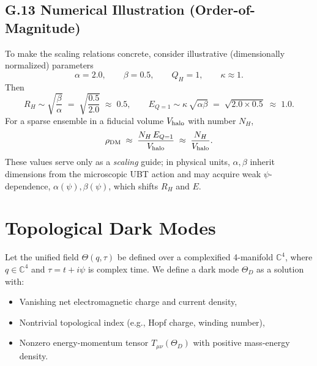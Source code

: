 \documentclass[12pt,a4paper]{article}
\numberwithin{equation}{section}
\theoremstyle{definition}
\theoremstyle{remark}
\begin{document}
\subsection*{G.13 Numerical Illustration (Order-of-Magnitude)}
To make the scaling relations concrete, consider illustrative (dimensionally normalized) parameters
\begin{equation}
\alpha = 2.0,\qquad \beta = 0.5,\qquad Q_H=1,\qquad \kappa \approx 1.
\end{equation}
Then
\begin{equation}
R_H \sim \sqrt{\frac{\beta}{\alpha}} \;=\; \sqrt{\frac{0.5}{2.0}} \;\approx\; 0.5,\qquad
E_{Q=1} \sim \kappa\,\sqrt{\alpha\beta} \;=\; \sqrt{2.0\times 0.5} \;\approx\; 1.0.
\end{equation}
For a sparse ensemble in a fiducial volume $V_{\rm halo}$ with number $N_H$,
\begin{equation}
\rho_{\rm DM} \;\approx\; \frac{N_H\,E_{Q=1}}{V_{\rm halo}} \;\approx\; \frac{N_H}{V_{\rm halo}}.
\end{equation}
These values serve only as a \emph{scaling} guide; in physical units, $\alpha,\beta$ inherit dimensions from the microscopic UBT action and may acquire weak $\psi$-dependence, $\alpha(\psi),\beta(\psi)$, which shifts $R_H$ and $E$.



\maketitle

\section{Topological Dark Modes}
Let the unified field \( \Theta(q, \tau) \) be defined over a complexified 4-manifold \( \mathbb{C}^4 \), where \( q \in \mathbb{C}^4 \) and \( \tau = t + i\psi \) is complex time. We define a dark mode \( \Theta_D \) as a solution with:

\begin{itemize}
  \item Vanishing net electromagnetic charge and current density,
  \item Nontrivial topological index (e.g., Hopf charge, winding number),
  \item Nonzero energy-momentum tensor \( T_{\mu\nu}(\Theta_D) \) with positive mass-energy density.
\end{itemize}
\end{document}
